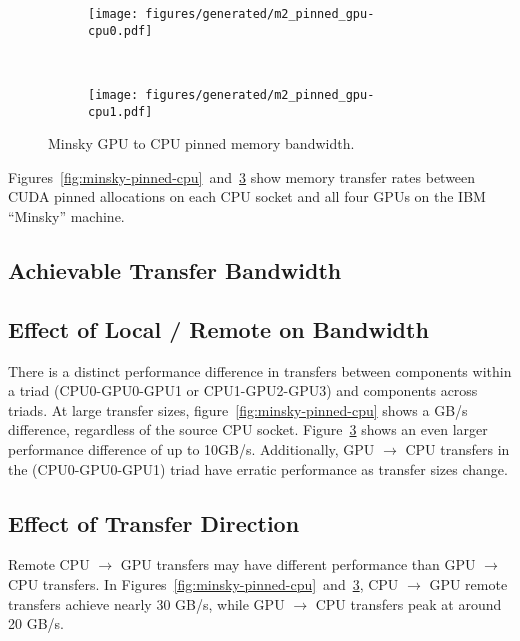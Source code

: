 \begin{figure}[ht]
    \centering
    \begin{subfigure}[b]{0.45\textwidth}
        \texttt{[image: figures/generated/m2\_pinned\_gpu-cpu0.pdf]}
        \caption{}
        \label{fig:minsky-topo-hardware}
    \end{subfigure}
    ~
    \begin{subfigure}[b]{0.45\textwidth}
        \texttt{[image: figures/generated/m2\_pinned\_gpu-cpu1.pdf]}
        \caption{}
        \label{fig:minsky-topo-cuda-simple}
    \end{subfigure}
    \caption[]{Minsky GPU to CPU pinned memory bandwidth.}
    \label{fig:minsky-pinned-gpu}
\end{figure}

Figures~\ref{fig:minsky-pinned-cpu}~and~\ref{fig:minsky-pinned-gpu} show memory transfer rates between CUDA pinned allocations on each CPU socket and all four GPUs on the IBM ``Minsky'' machine.

\subsection{Achievable Transfer Bandwidth}


\subsection{Effect of Local / Remote on Bandwidth}

There is a distinct performance difference in transfers between components within a triad (CPU0-GPU0-GPU1 or CPU1-GPU2-GPU3) and components across triads.
At large transfer sizes, figure~\ref{fig:minsky-pinned-cpu} shows a  GB/s difference, regardless of the source CPU socket.
Figure~\ref{fig:minsky-pinned-gpu} shows an even larger performance difference of up to 10GB/s.
Additionally, GPU $\rightarrow$ CPU transfers in the (CPU0-GPU0-GPU1) triad have erratic performance as transfer sizes change.

\subsection{Effect of Transfer Direction}

Remote CPU $\rightarrow$ GPU transfers may have different performance than GPU $\rightarrow$ CPU transfers.
        In Figures~\ref{fig:minsky-pinned-cpu}~and~\ref{fig:minsky-pinned-gpu}, CPU $\rightarrow$ GPU remote transfers achieve nearly 30 GB/s, while GPU $\rightarrow$ CPU transfers peak at around 20 GB/s.




